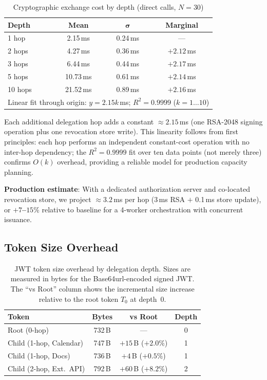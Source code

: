 \documentclass[journal]{IEEEtran}
\begin{document}
\begin{table}[h]
\caption{Cryptographic exchange cost by depth (direct calls, $N=30$)}
\label{tab:hopcosts}
\centering
\footnotesize
\begin{tabular}{lccc}
\toprule
\textbf{Depth} & \textbf{Mean} & $\boldsymbol\sigma$ & \textbf{Marginal} \\
\midrule
1 hop  &  2.15\,ms & 0.24\,ms & ---        \\
2 hops &  4.27\,ms & 0.36\,ms & $+2.12$\,ms \\
3 hops &  6.44\,ms & 0.44\,ms & $+2.17$\,ms \\
5 hops & 10.73\,ms & 0.61\,ms & $+2.14$\,ms \\
10 hops & 21.52\,ms & 0.89\,ms & $+2.16$\,ms \\
\midrule
\multicolumn{4}{l}{\scriptsize
  Linear fit through origin: $y = 2.15k$\,ms;\; $R^2 = 0.9999$ ($k=1\ldots10$)}
\end{tabular}
\end{table}

Each additional delegation hop adds a constant $\approx 2.15$\,ms (one RSA-2048
signing operation plus one revocation store write). This linearity follows from
first principles: each hop performs an independent constant-cost operation with no
inter-hop dependency; the $R^2 = 0.9999$ fit over ten data points (not merely
three) confirms $O(k)$ overhead, providing a reliable model for production
capacity planning.

\textbf{Production estimate}: With a dedicated authorization server and
co-located revocation store, we project $\approx 3.2$\,ms per hop (3\,ms RSA
$+$ 0.1\,ms store update), or \textbf{$+7$--$15\%$} relative to baseline for
a 4-worker orchestration with concurrent issuance.

\subsection{Token Size Overhead}

\begin{table}[h]
\caption{JWT token size overhead by delegation depth. Sizes are measured in bytes
for the Base64url-encoded signed JWT. The ``vs Root'' column shows the incremental
size increase relative to the root token $T_0$ at depth~0.}
\label{tab:tokensizes}
\centering
\footnotesize
\begin{tabular}{lccc}
\toprule
\textbf{Token} & \textbf{Bytes} & \textbf{vs Root} & \textbf{Depth} \\
\midrule
Root (0-hop)             & 732\,B & ---                    & 0 \\
Child (1-hop, Calendar)  & 747\,B & $+15$\,B ($+2.0\%$)   & 1 \\
Child (1-hop, Docs)      & 736\,B & $+4$\,B ($+0.5\%$)    & 1 \\
Child (2-hop, Ext.\ API) & 792\,B & $+60$\,B ($+8.2\%$)   & 2 \\
\bottomrule
\end{tabular}
\end{table}
\end{document}
